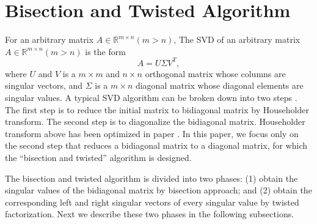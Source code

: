 \section{Bisection and Twisted Algorithm} \label{sec:algorithm}
For an arbitrary matrix $A\in \mathbb{R}^{m \times n} (m>n)$,
The SVD of an arbitrary matrix $A\in \mathbb{R}^{m \times n} (m>n)$ is the form 
\[A = U \Sigma V^T,\] where $U$ and $V$ is a $m \times m$ and $n \times n$ orthogonal matrix whose columns are singular vectors, and $\Sigma$ is a $m\times n$ diagonal matrix whose diagonal elements are singular values.
A typical SVD algorithm can be broken down into two steps \cite{65SIAM}.
The first step is to reduce the initial matrix to bidiagonal matrix by Householder transform.
The second step is to diagonalize the bidiagonal matrix.
Householder transform above has been optimized in paper \cite{LiuHouseholder}.
In this paper, we focus only on the second step that reduces a bidiagonal matrix to a diagonal matrix, for which the ``bisection and twisted'' algorithm is designed.
 
The bisection and twisted algorithm is divided into two phases:
(1) obtain the singular values of the bidiagonal matrix by bisection approach; and
(2) obtain the corresponding left and right singular vectors of every singular value by twisted factorization.
Next we describe these two phases in the following subsections.


